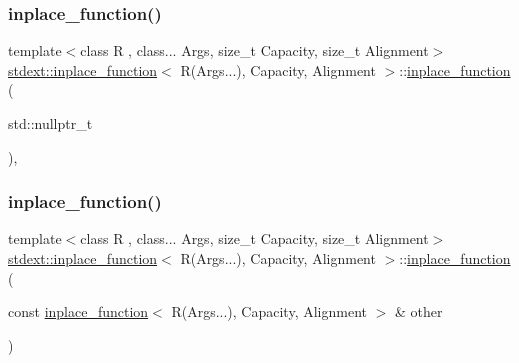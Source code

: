 \subsubsection{\texorpdfstring{inplace\+\_\+function()}{inplace\_function()}\hspace{0.1cm}{\footnotesize\ttfamily [5/14]}}
{\footnotesize\ttfamily template$<$class R , class... Args, size\+\_\+t Capacity, size\+\_\+t Alignment$>$ \\
\hyperlink{classstdext_1_1inplace__function}{stdext\+::inplace\+\_\+function}$<$ R(Args...), Capacity, Alignment $>$\+::\hyperlink{classstdext_1_1inplace__function}{inplace\+\_\+function} (\begin{DoxyParamCaption}\item[{std\+::nullptr\+\_\+t}]{ }\end{DoxyParamCaption})\hspace{0.3cm}{\ttfamily [inline]}, {\ttfamily [noexcept]}}

\mbox{\label{classstdext_1_1inplace__function_3_01R_07Args_8_8_8_08_00_01Capacity_00_01Alignment_01_4_a1ccbc60554d934faf7c8e4188f6141b0}} 
\subsubsection{\texorpdfstring{inplace\+\_\+function()}{inplace\_function()}\hspace{0.1cm}{\footnotesize\ttfamily [6/14]}}
{\footnotesize\ttfamily template$<$class R , class... Args, size\+\_\+t Capacity, size\+\_\+t Alignment$>$ \\
\hyperlink{classstdext_1_1inplace__function}{stdext\+::inplace\+\_\+function}$<$ R(Args...), Capacity, Alignment $>$\+::\hyperlink{classstdext_1_1inplace__function}{inplace\+\_\+function} (\begin{DoxyParamCaption}\item[{const \hyperlink{classstdext_1_1inplace__function}{inplace\+\_\+function}$<$ R(Args...), Capacity, Alignment $>$ \&}]{other }\end{DoxyParamCaption})\hspace{0.3cm}{\ttfamily [inline]}}


